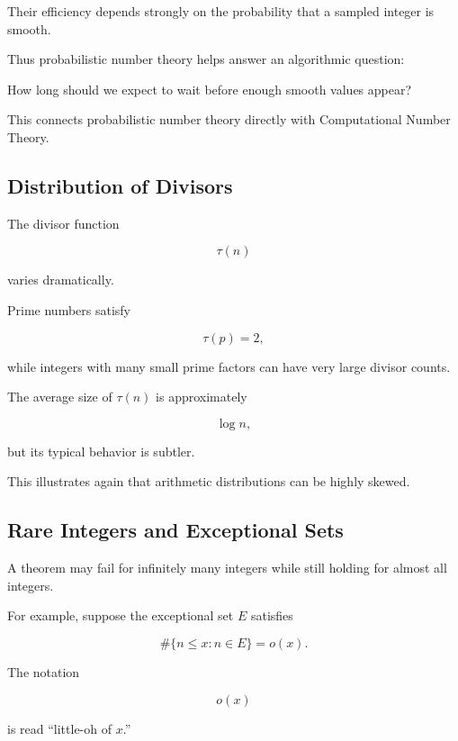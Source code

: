 Their efficiency depends strongly on the probability that a sampled integer
is smooth.

Thus probabilistic number theory helps answer an algorithmic question:

\begin{center}
How long should we expect to wait before enough smooth values appear?
\end{center}

This connects probabilistic number theory directly with Computational Number
Theory.

\subsection{Distribution of Divisors}
\label{subsec:probabilistic-distribution-divisors}

The divisor function

\[ \tau(n) \]

varies dramatically.

Prime numbers satisfy

\[ \tau(p)=2, \]

while integers with many small prime factors can have very large divisor
counts.

The average size of \(\tau(n)\) is approximately

\[ \log n, \]

but its typical behavior is subtler.

This illustrates again that arithmetic distributions can be highly skewed.

\subsection{Rare Integers and Exceptional Sets}
\label{subsec:exceptional-sets}

A theorem may fail for infinitely many integers while still holding for
almost all integers.

For example, suppose the exceptional set \(E\) satisfies

\[ \#\{n\leq x:n\in E\}=o(x). \]

The notation

\[ o(x) \]

is read ``little-oh of \(x\).''


